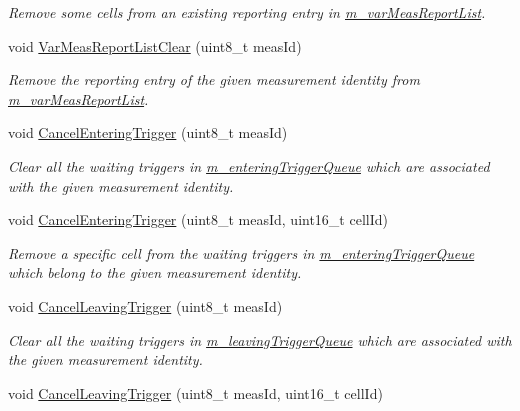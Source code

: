 \begin{DoxyCompactItemize}
\begin{DoxyCompactList}\small\item\em Remove some cells from an existing reporting entry in \hyperlink{classns3_1_1LteUeRrc_a82da3c138c967761910c02b83724a0e4}{m\+\_\+var\+Meas\+Report\+List}. \end{DoxyCompactList}\item 
void \hyperlink{classns3_1_1LteUeRrc_aa1a5d20a96dec717502ccf0030921f53}{Var\+Meas\+Report\+List\+Clear} (uint8\+\_\+t meas\+Id)
\begin{DoxyCompactList}\small\item\em Remove the reporting entry of the given measurement identity from \hyperlink{classns3_1_1LteUeRrc_a82da3c138c967761910c02b83724a0e4}{m\+\_\+var\+Meas\+Report\+List}. \end{DoxyCompactList}\item 
void \hyperlink{classns3_1_1LteUeRrc_a9221d85411de5dd375b71b44e3331c5c}{Cancel\+Entering\+Trigger} (uint8\+\_\+t meas\+Id)
\begin{DoxyCompactList}\small\item\em Clear all the waiting triggers in \hyperlink{classns3_1_1LteUeRrc_a06a26d8b08a9c635d7fa6ff8381fff4f}{m\+\_\+entering\+Trigger\+Queue} which are associated with the given measurement identity. \end{DoxyCompactList}\item 
void \hyperlink{classns3_1_1LteUeRrc_a070a2db0527d28e65c46eb344afcaf90}{Cancel\+Entering\+Trigger} (uint8\+\_\+t meas\+Id, uint16\+\_\+t cell\+Id)
\begin{DoxyCompactList}\small\item\em Remove a specific cell from the waiting triggers in \hyperlink{classns3_1_1LteUeRrc_a06a26d8b08a9c635d7fa6ff8381fff4f}{m\+\_\+entering\+Trigger\+Queue} which belong to the given measurement identity. \end{DoxyCompactList}\item 
void \hyperlink{classns3_1_1LteUeRrc_a3e35c475cfb5361222f1556bfbd3111d}{Cancel\+Leaving\+Trigger} (uint8\+\_\+t meas\+Id)
\begin{DoxyCompactList}\small\item\em Clear all the waiting triggers in \hyperlink{classns3_1_1LteUeRrc_a7984d05cbcc51cd9239a22bd7e400d06}{m\+\_\+leaving\+Trigger\+Queue} which are associated with the given measurement identity. \end{DoxyCompactList}\item 
void \hyperlink{classns3_1_1LteUeRrc_a45a88ac7b43064b5d052920dee05b373}{Cancel\+Leaving\+Trigger} (uint8\+\_\+t meas\+Id, uint16\+\_\+t cell\+Id)

\end{DoxyCompactItemize}
